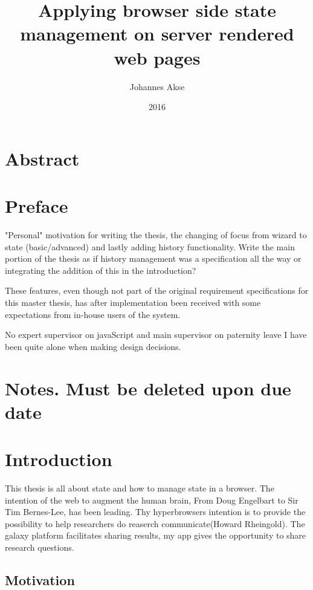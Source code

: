 \documentclass[english]{ifimaster}
\title{Applying browser side state management on server rendered web pages}
\subtitle{}
\author{Johannes Akse}
\date{2016}
\begin{document}
\maketitle{}
\chapter*{Abstract}
\tableofcontents
\nocite{*}

\chapter*{Preface}
"Personal" motivation for writing the thesis, the changing of focus from wizard to state (basic/advanced) and lastly adding history functionality. Write the main portion of the thesis as if history management was a specification all the way or integrating the addition of this in the introduction?

These features, even though not part of the original requirement specifications for this master thesis, has after implementation been received with some expectations from in-house users of the system. 

No expert supervisor on javaScript and main supervisor on paternity leave I have been quite alone when making design decisions. 
\chapter{Notes. Must be deleted upon due date}

   

\chapter{Introduction}
This thesis is all about state and how to manage state in a browser.
The intention of the web to augment the human brain, From Doug Engelbart to Sir Tim Bernes-Lee, has been leading. Thy hyperbrowsers intention is to provide the possibility to help researchers do reaserch communicate(Howard Rheingold). The galaxy platform facilitates sharing results, my app gives the opportunity to share research questions.  
\section{Motivation}%
\end{document}
